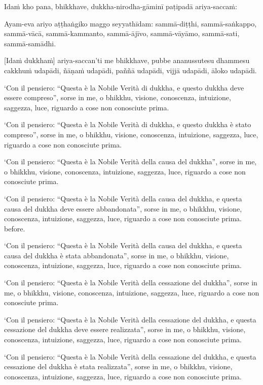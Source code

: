 Idaṁ kho pana, bhikkhave, dukkha-nirodha-gāminī paṭipadā ariya-saccaṁ:

Ayam-eva ariyo aṭṭhaṅgiko maggo seyyathīdam: sammā-diṭṭhi,
sammā-saṅkappo, sammā-vācā, sammā-kammanto, sammā-ājīvo, sammā-vāyāmo,
sammā-sati, sammā-samādhi.

\enlargethispage{\baselineskip}

[Idaṁ dukkhaṁ] ariya-saccan'ti me bhikkhave, pubbe ananussutesu dhammesu
cakkhuṁ udapādi, ñāṇaṁ udapādi, paññā udapādi, vijjā udapādi, āloko
udapādi.

\clearpage

\englishText
\markboth{\englishTitle}{\rightmark}

‘Con il pensiero: “Questa è la Nobile Verità di dukkha, e questo dukkha
deve essere compreso”, sorse in me, o bhikkhu, visione, conoscenza,
intuizione, saggezza, luce, riguardo a cose non conosciute prima.

‘Con il pensiero: “Questa è la Nobile Verità di dukkha, e questo dukkha
è stato compreso”, sorse in me, o bhikkhu, visione, conoscenza,
intuizione, saggezza, luce, riguardo a cose non conosciute prima.

‘Con il pensiero: “Questa è la Nobile Verità della causa del dukkha”,
sorse in me, o bhikkhu, visione, conoscenza, intuizione, saggezza, luce,
riguardo a cose non conosciute prima.

‘Con il pensiero: “Questa è la Nobile Verità della causa del dukkha, e
questa causa del dukkha deve essere abbandonata”, sorse in me, o bhikkhu,
visione, conoscenza, intuizione, saggezza, luce, riguardo a cose non conosciute
prima.
before.

‘Con il pensiero: “Questa è la Nobile Verità della causa del dukkha, e
questa causa del dukkha è stata abbandonata”, sorse in me, o bhikkhu,
visione, conoscenza, intuizione, saggezza, luce, riguardo a cose non conosciute
prima.

‘Con il pensiero: “Questa è la Nobile Verità della cessazione del dukkha”,
sorse in me, o bhikkhu, visione, conoscenza, intuizione, saggezza, luce,
riguardo a cose non conosciute prima.

‘Con il pensiero: “Questa è la Nobile Verità della cessazione del dukkha,
e questa cessazione del dukkha deve essere realizzata”, sorse in me,
o bhikkhu, visione, conoscenza, intuizione, saggezza, luce, riguardo a cose
non conosciute prima.

‘Con il pensiero: “Questa è la Nobile Verità della cessazione del dukkha,
e questa cessazione del dukkha è stata realizzata”, sorse in me,
o bhikkhu, visione, conoscenza, intuizione, saggezza, luce, riguardo a cose
non conosciute prima.

